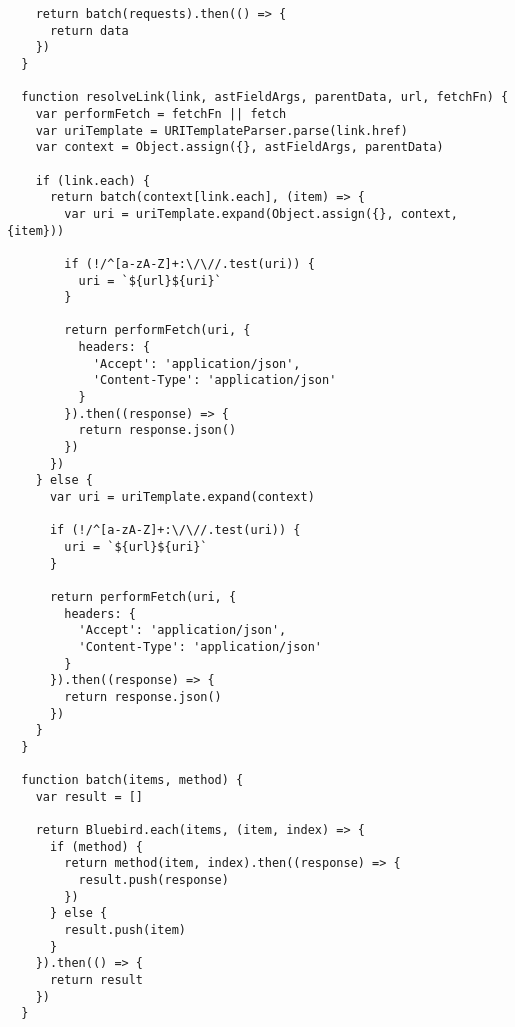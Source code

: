 \begin{verbatim}
    return batch(requests).then(() => {
      return data
    })
  }

  function resolveLink(link, astFieldArgs, parentData, url, fetchFn) {
    var performFetch = fetchFn || fetch
    var uriTemplate = URITemplateParser.parse(link.href)
    var context = Object.assign({}, astFieldArgs, parentData)

    if (link.each) {
      return batch(context[link.each], (item) => {
        var uri = uriTemplate.expand(Object.assign({}, context, {item}))

        if (!/^[a-zA-Z]+:\/\//.test(uri)) {
          uri = `${url}${uri}`
        }

        return performFetch(uri, {
          headers: {
            'Accept': 'application/json',
            'Content-Type': 'application/json'
          }
        }).then((response) => {
          return response.json()
        })
      })
    } else {
      var uri = uriTemplate.expand(context)

      if (!/^[a-zA-Z]+:\/\//.test(uri)) {
        uri = `${url}${uri}`
      }

      return performFetch(uri, {
        headers: {
          'Accept': 'application/json',
          'Content-Type': 'application/json'
        }
      }).then((response) => {
        return response.json()
      })
    }
  }

  function batch(items, method) {
    var result = []

    return Bluebird.each(items, (item, index) => {
      if (method) {
        return method(item, index).then((response) => {
          result.push(response)
        })
      } else {
        result.push(item)
      }
    }).then(() => {
      return result
    })
  }
\end{verbatim}

